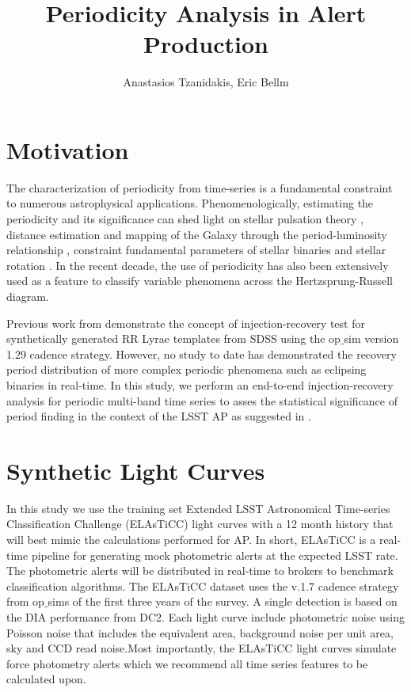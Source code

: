 \documentclass[DM,authoryear,toc]{lsstdoc}
\title{Periodicity Analysis in Alert Production}
\author{%
Anastasios Tzanidakis, Eric Bellm
}
\date{\vcsDate}
\begin{document}
\maketitle



\section{Motivation}
The characterization of periodicity from time-series is a fundamental constraint to numerous astrophysical applications.
Phenomenologically, estimating the periodicity and its significance can shed light on stellar pulsation theory \citep{Antonello:Antonello81}, distance estimation and mapping of the Galaxy through the period-luminosity relationship \citep{Skowron:Skowron2019}, constraint fundamental parameters of stellar binaries \citep{Farinella:Farinella1979} and stellar rotation \citep{Walkowicz:Walkowicz13}.
In the recent decade, the use of periodicity has also been extensively used as a feature to classify variable phenomena \citep{Richards:R13} across the Hertzsprung-Russell diagram.

Previous work from \cite{2012AJ....144....9O} demonstrate the concept of injection-recovery test for synthetically generated RR Lyrae templates from SDSS using the op$\_$sim version 1.29 cadence strategy.
However, no study to date has demonstrated the recovery period distribution of more complex periodic phenomena such as eclipsing binaries in real-time.
In this study, we perform an end-to-end injection-recovery analysis for periodic multi-band time series to asses the statistical significance of period finding in the context of the LSST AP as suggested in .

\section{Synthetic Light Curves}
In this study we use the training set Extended LSST Astronomical Time-series Classification Challenge (ELAsTiCC) light curves with a 12 month history that will best mimic the calculations performed for AP. In short, ELAsTiCC is a real-time pipeline for generating mock photometric alerts at the expected LSST rate. The photometric alerts will be distributed in real-time to brokers to benchmark classification algorithms.
The ELAsTiCC dataset uses the v.1.7 cadence strategy from op$\_$sims of the first three years of the survey.
A single detection is based on the DIA performance from DC2. Each light curve include photometric noise using Poisson noise that includes the equivalent area, background noise per unit area, sky and CCD read noise.Most importantly, the ELAsTiCC light curves simulate force photometry alerts which we recommend all time series features to be calculated upon.
\end{document}
